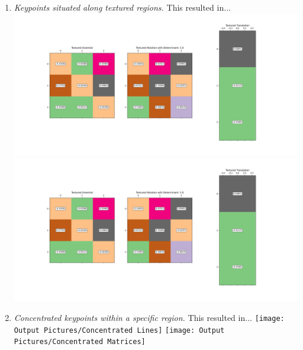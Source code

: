 \documentclass[11pt]{article}
\begin{document}
\begin{itemize}
\begin{enumerate}
            \item \textit{Keypoints situated along textured regions.}\newline
            This resulted in$\ldots$\newline
            \includegraphics[width=\textwidth]{Output Pictures/Textured Lines}\newline
            \includegraphics[width=\textwidth]{Output Pictures/Textured Matrices}\newline

            \item \textit{Concentrated keypoints within a specific region.}\newline
            This resulted in$\ldots$\newline
            \texttt{[image: Output Pictures/Concentrated Lines]}\newline
            \texttt{[image: Output Pictures/Concentrated Matrices]}\newline


\end{enumerate}
\end{itemize}
\end{document}
